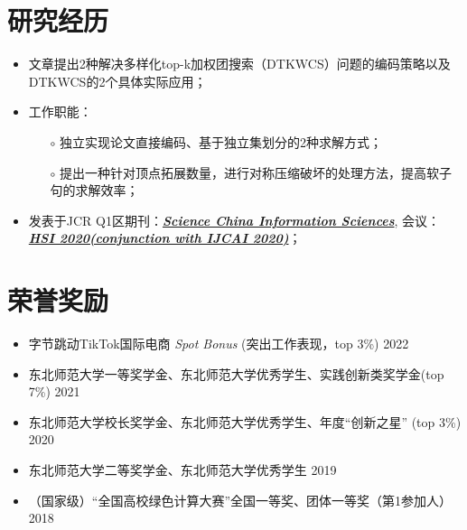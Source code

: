 \documentclass{resume}
\begin{document}
\section{研究经历}
\begin{itemize}[parsep=0.3ex] \normalsize
    \item 文章提出2种解决多样化top-k加权团搜索（DTKWCS）问题的编码策略以及DTKWCS的2个具体实际应用；
    \item 工作职能：
        \begin{itemize}
          \item[$\circ$] 独立实现论文直接编码、基于独立集划分的2种求解方式；
          \item[$\circ$] 提出一种针对顶点拓展数量，进行对称压缩破坏的处理方法，提高软子句的求解效率；
        \end{itemize}
    \item 发表于JCR Q1区期刊：\textbf{\href{http://scis.scichina.com}{\textit{Science China Information Sciences}}}, 
    会议：\textbf{\href{https://hsi-workshop.github.io/hsi2020-website/program.html}{\textit{HSI 2020(conjunction with IJCAI 2020)}}}；
\end{itemize}

\section{荣誉奖励}
\begin{itemize}[parsep=0.2ex] \normalsize
    \item 字节跳动TikTok国际电商 \textit{Spot Bonus} (突出工作表现，top 3\%) \hfill 2022
    \item 东北师范大学一等奖学金、东北师范大学优秀学生、实践创新类奖学金(top 7\%)  \hfill 2021
    \item 东北师范大学校长奖学金、东北师范大学优秀学生、年度“创新之星” (top 3\%)  \hfill 2020
    \item 东北师范大学二等奖学金、东北师范大学优秀学生  \hfill 2019
    \item （国家级）“全国高校绿色计算大赛”全国一等奖、团体一等奖（第1参加人）\hfill 2018
\end{itemize}
\end{document}
